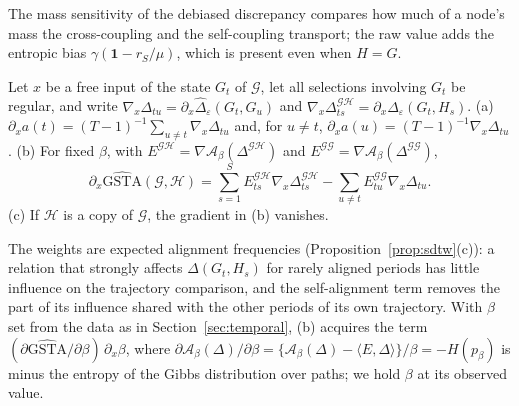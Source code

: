 The mass sensitivity of the debiased discrepancy compares how much of a node's mass the cross-coupling and the self-coupling transport; the raw value adds the entropic bias $\gamma(\mathbf 1-r_S/\mu)$, which is present even when $H=G$.

\begin{proposition}\label{prop:gradgsta}
Let $x$ be a free input of the state $G_t$ of $\mathcal G$, let all selections involving $G_t$ be regular, and write $\nabla_x\Delta_{tu}=\partial_x\widehat\Delta_\varepsilon(G_t,G_u)$ and $\nabla_x\Delta^{\mathcal{GH}}_{ts}=\partial_x\widehat\Delta_\varepsilon(G_t,H_s)$.
(a) $\partial_xa(t)=(T-1)^{-1}\sum_{u\neq t}\nabla_x\Delta_{tu}$ and, for $u\ne t$, $\partial_xa(u)=(T-1)^{-1}\nabla_x\Delta_{tu}$.
(b) For fixed $\beta$, with $E^{\mathcal{GH}}=\nabla\mathcal A_\beta(\Delta^{\mathcal{GH}})$ and $E^{\mathcal{GG}}=\nabla\mathcal A_\beta(\Delta^{\mathcal{GG}})$,
\[
\partial_x\widehat{\mathrm{GSTA}}(\mathcal G,\mathcal H)=\sum_{s=1}^{S}E^{\mathcal{GH}}_{ts}\nabla_x\Delta^{\mathcal{GH}}_{ts}-\sum_{u\neq t}E^{\mathcal{GG}}_{tu}\nabla_x\Delta_{tu}.
\]
(c) If $\mathcal H$ is a copy of $\mathcal G$, the gradient in (b) vanishes.
\end{proposition}

The weights are expected alignment frequencies (Proposition~\ref{prop:sdtw}(c)): a relation that strongly affects $\Delta(G_t,H_s)$ for rarely aligned periods has little influence on the trajectory comparison, and the self-alignment term removes the part of its influence shared with the other periods of its own trajectory. With $\beta$ set from the data as in Section~\ref{sec:temporal}, (b) acquires the term $(\partial\widehat{\mathrm{GSTA}}/\partial\beta)\,\partial_x\beta$, where $\partial\mathcal A_\beta(\Delta)/\partial\beta=\{\mathcal A_\beta(\Delta)-\langle E,\Delta\rangle\}/\beta=-H(p_\beta)$ is minus the entropy of the Gibbs distribution over paths; we hold $\beta$ at its observed value.

